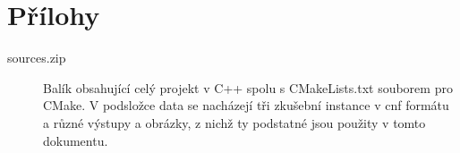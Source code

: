 \documentclass[12pt,a4paper]{article}
\begin{document}
\section*{Přílohy}

\begin{description}
    \item[sources.zip] Balík obsahující celý projekt v C++ spolu s CMakeLists.txt souborem pro CMake. V podsložce data se nacházejí tři zkušební instance v cnf formátu a různé výstupy a obrázky, z nichž ty podstatné jsou použity v tomto dokumentu.
\end{description}
\end{document}

